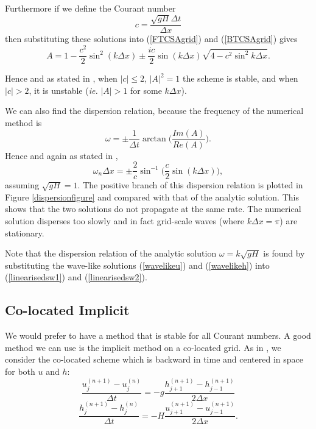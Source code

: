 \documentclass[a4paper, 10.8pt, notitlepage]{article}
\begin{document}
Furthermore if we define the Courant number 
\begin{equation}\label{Courantnumber}
c = \frac{\sqrt{gH}\Delta t}{\Delta x}
\end{equation}
then substituting these solutions into (\ref{FTCSAgrid}) and (\ref{BTCSAgrid}) gives
\begin{equation}
A = 1 - \frac{c^{2}}{2} \sin^{2}(k\Delta x) \pm \frac{ic}{2}\sin(k\Delta x)\sqrt{4 - c^{2}\sin^{2}k\Delta x}.
\end{equation} 
 
Hence and as stated in \cite{MPE textbook}, when $\lvert c \rvert \leq 2$, $\lvert A \rvert^{2} = 1$ the scheme is stable, and when $\lvert c \rvert > 2$, it is unstable (\textit{ie.} $\vert A \rvert > 1$ for some $k\Delta x$).
 
We can also find the dispersion relation, because the frequency of the numerical method is 
\begin{equation} \label{frequency}
\omega = \pm \frac{1}{\Delta t} \arctan\bigg(\frac{Im(A)}{Re(A)}\bigg).
\end{equation}
Hence and again as stated in \cite{MPE textbook}, 
\begin{equation}
\omega_{n}\Delta x = \pm \frac{2}{c} \sin^{-1} \bigg(\frac{c}{2}\sin(k\Delta x)\bigg),
\end{equation}
assuming $\sqrt{gH} = 1$. The positive branch of this dispersion relation is plotted in Figure \ref{dispersionfigure} and compared with that of the analytic solution. This shows that the two solutions do not propagate at the same rate. The numerical solution disperses too slowly and in fact grid-scale waves (where $k\Delta x = \pi$) are stationary.

Note that the dispersion relation of the analytic solution $\omega = k\sqrt{gH}$ is found by substituting the wave-like solutions (\ref{wavelikeu}) and (\ref{wavelikeh}) into (\ref{linearisedsw1}) and (\ref{linearisedsw2}). 

\subsection{Co-located Implicit}
We would prefer to have a method that is stable for all Courant numbers. A good method we can use is the implicit method on a co-located grid. As in \cite{MPE textbook}, we consider the co-located scheme which is backward in time and centered in space for both $u$ and $h$:
\begin{equation} \label{FTimplicitAgrid1}
\frac{u_{j}^{(n+1)} - u_{j}^{(n)}}{\Delta t} = -g \frac{h_{j+1}^{(n+1)} - h_{j-1}^{(n+1)}}{2\Delta x}
\end{equation}
\begin{equation}\label{FTimplicitAgrid2}
\frac{h_{j}^{(n+1)} - h_{j}^{(n)}}{\Delta t} = -H \frac{u_{j+1}^{(n+1)} - u_{j-1}^{(n+1)}}{2\Delta x}.
\end{equation}
\end{document}
